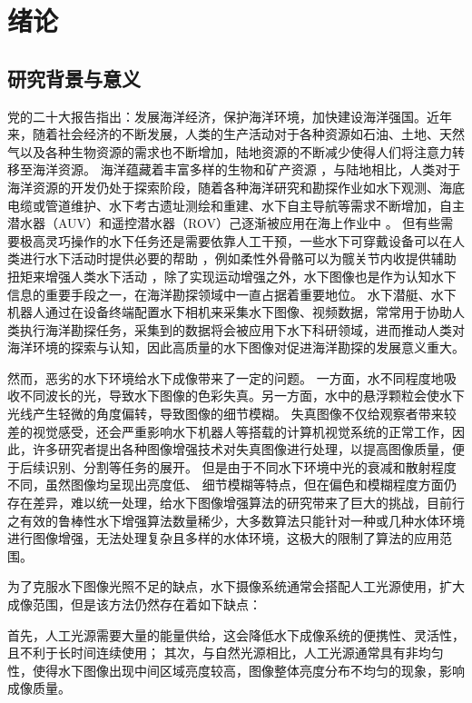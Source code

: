 
\chapter{绪论}

\section{研究背景与意义}
党的二十大报告指出：发展海洋经济，保护海洋环境，加快建设海洋强国。近年来，随着社会经济的不断发展，人类的生产活动对于各种资源如石油、土地、天然气以及各种生物资源的需求也不断增加，陆地资源的不断减少使得人们将注意力转移至海洋资源。
海洋蕴藏着丰富多样的生物和矿产资源 \cite{ocean_energy}，与陆地相比，人类对于海洋资源的开发仍处于探索阶段，随着各种海洋研究和勘探作业如水下观测、海底电缆或管道维护、水下考古遗址测绘和重建、水下自主导航等需求不断增加，自主潜水器（AUV）和遥控潜水器（ROV）己逐渐被应用在海上作业中 \cite{auv}\cite{rov}。
但有些需要极高灵巧操作的水下任务还是需要依靠人工干预，一些水下可穿戴设备可以在人类进行水下活动时提供必要的帮助 \cite{Xia2022}，例如柔性外骨骼可以为髋关节内收提供辅助扭矩来增强人类水下活动 \cite{Xia2023}，除了实现运动增强之外，水下图像也是作为认知水下信息的重要手段之一，在海洋勘探领域中一直占据着重要地位。
水下潜艇、水下机器人通过在设备终端配置水下相机来采集水下图像、视频数据，常常用于协助人类执行海洋勘探任务，采集到的数据将会被应用下水下科研领域，进而推动人类对海洋环境的探索与认知，因此高质量的水下图像对促进海洋勘探的发展意义重大。

然而，恶劣的水下环境给水下成像带来了一定的问题。
一方面，水不同程度地吸收不同波长的光，导致水下图像的色彩失真。另一方面，水中的悬浮颗粒会使水下光线产生轻微的角度偏转，导致图像的细节模糊。
失真图像不仅给观察者带来较差的视觉感受，还会严重影响水下机器人等搭载的计算机视觉系统的正常工作，因此，许多研究者提出各种图像增强技术对失真图像进行处理，以提高图像质量，便于后续识别、分割等任务的展开。
但是由于不同水下环境中光的衰减和散射程度不同，虽然图像均呈现出亮度低、 细节模糊等特点，但在偏色和模糊程度方面仍存在差异，难以统一处理，给水下图像增强算法的研究带来了巨大的挑战，目前行之有效的鲁棒性水下增强算法数量稀少，大多数算法只能针对一种或几种水体环境进行图像增强，无法处理复杂且多样的水体环境，这极大的限制了算法的应用范围。

为了克服水下图像光照不足的缺点，水下摄像系统通常会搭配人工光源使用，扩大成像范围，但是该方法仍然存在着如下缺点：

首先，人工光源需要大量的能量供给，这会降低水下成像系统的便携性、灵活性，且不利于长时间连续使用；
其次，与自然光源相比，人工光源通常具有非均匀性，使得水下图像出现中间区域亮度较高，图像整体亮度分布不均匀的现象，影响成像质量。

